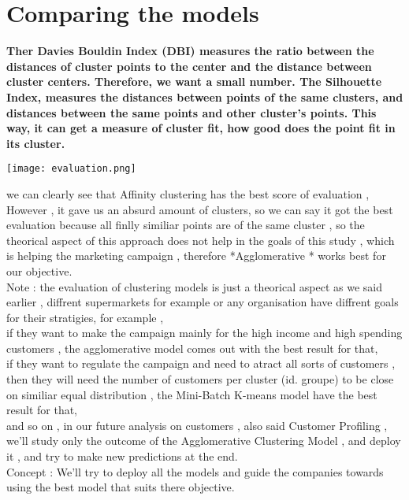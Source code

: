 \documentclass[12pt,a4paper]{report}
\begin{document}
\chapter{Comparing the models }

\textbf{Ther Davies Bouldin Index (DBI) measures the ratio between the distances of cluster points to the center and the distance between cluster centers. Therefore, we want a small number. The Silhouette Index, measures the distances between points of the same clusters, and distances between the same points and other cluster's points. This way, it can get a measure of cluster fit, how good does the point fit in its cluster.}
\begin{center}
    \texttt{[image: evaluation.png]}

\end{center} 

we can clearly see that Affinity clustering has the best score of evaluation , However , it gave us an absurd amount of clusters, so we can say it got the best evaluation because all finlly similiar points are of the same cluster , so the theorical aspect of this approach does not help in the goals of this study , which is helping the marketing campaign , therefore *Agglomerative * works best for our objective.\\

Note : the evaluation of clustering models is just a theorical aspect as we said earlier , diffrent supermarkets for example or any organisation have diffrent goals for their stratigies, for example ,\\

if they want to make the campaign mainly for the high income and high spending customers , the agglomerative model comes out with the best result for that,\\

if they want to regulate the campaign and need to atract all sorts of customers , then they will need the number of customers per cluster (id. groupe) to be close on similiar equal distribution , the Mini-Batch K-means model have the best result for that,\\

and so on , in our future analysis on customers , also said Customer Profiling , we'll study only the outcome of the Agglomerative Clustering Model , and deploy it , and try to make new predictions at the end.\\

Concept : We'll try to deploy all the models and guide the companies towards using the best model that suits there objective.\\
\end{document}
